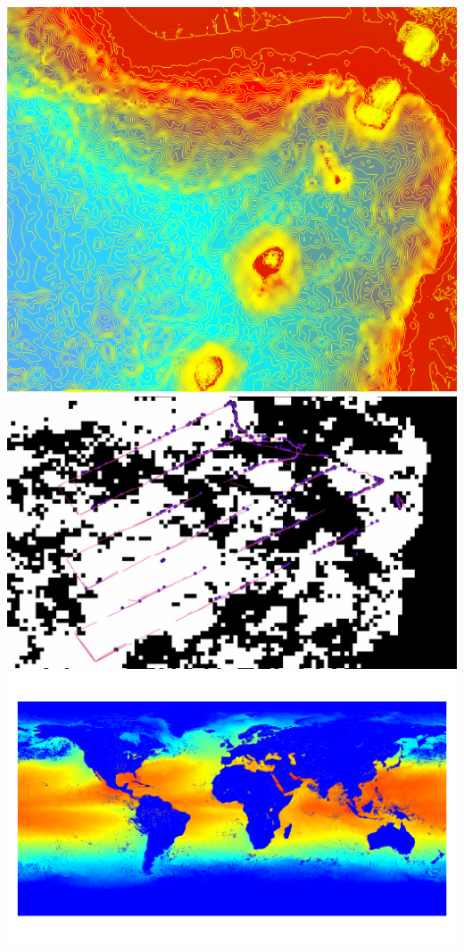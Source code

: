 \documentclass[hyperref={pdfpagelabels=true}]{beamer}
\begin{document}
\begin{frame}
\begin{titlepage}
  \includegraphics[height=.15\textheight]{head6.png}
  \includegraphics[height=.15\textheight]{head8.png}
  \includegraphics[height=.15\textheight]{head9.png}

\end{titlepage}
\end{frame}
\end{document}
